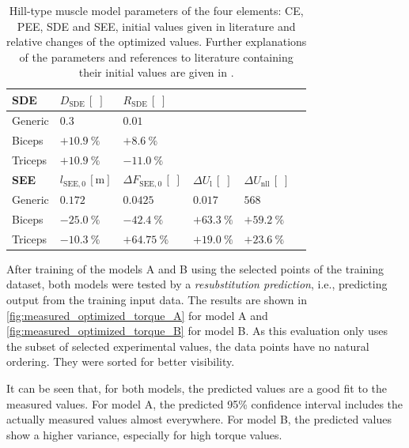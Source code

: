 \begin{table}[t]
\begin{tabular}{@{}llllll@{}}
    \addlinespace[2ex]
    \textbf{SDE} 
      & $D_{\mathrm{SDE}} \,[\;]$ 
      & $R_{\mathrm{SDE}} \,[\;]$ 
      \\ \midrule
    Generic & $0.3$ & $0.01$    \\ %
    Biceps & $+\SI{10.9}{\percent}$ & $+\SI{8.6}{\percent}$   \\ %
    Triceps & $+\SI{10.9}{\percent}$ & $-\SI{11.0}{\percent}$  \\ %
    \addlinespace[2ex]
    \textbf{SEE} 
      & $l_{\mathrm{SEE},0}\,[\mathrm{m}]$ 
      & $\Delta F_{\mathrm{SEE},0} \,[\;]$  
      & $\Delta U_\text{l} \,[\;]$  
      & $\Delta U_\text{nll}\,[\;]$
      \\ \hline
    Generic & $0.172$ & $0.0425$ & $0.017$ & $568$ \\ %
    Biceps & $-\SI{25.0}{\percent}$ & $-\SI{42.4}{\percent}$ & $+\SI{63.3}{\percent}$ & $+\SI{59.2}{\percent}$ \\ %
    Triceps & $-\SI{10.3}{\percent}$ & $+\SI{64.75}{\percent}$ & $+\SI{19.0}{\percent}$ & $+\SI{23.6}{\percent}$ \\ %
    \bottomrule
  \end{tabular}

  \caption{Hill-type muscle model parameters of the four elements: CE, PEE, SDE and SEE, initial values given in literature and relative changes of the optimized values. Further explanations of the parameters and references to literature containing their initial values are given in \cite{Hilltype2014}.}
  \label{tab:model_b_parameters}
\end{table}

After training of the models A and B using the selected points of the training dataset, both models were tested by a \emph{resubstitution prediction}, i.e., predicting output from the training input data. The results are shown in \cref{fig:measured_optimized_torque_A} for model A and \cref{fig:measured_optimized_torque_B} for model B. As this evaluation only uses the subset of selected experimental values, the data points have no natural ordering. They were sorted for better visibility.

It can be seen that, for both models, the predicted values are a good fit to the measured values. For model A, the predicted 95\% confidence interval includes the actually measured values almost everywhere. For model B, the predicted values show a higher variance, especially for high torque values.


